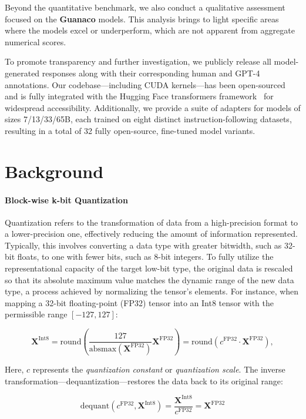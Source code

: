 Beyond the quantitative benchmark, we also conduct a qualitative assessment focused on the \textbf{Guanaco} models. This analysis brings to light specific areas where the models excel or underperform, which are not apparent from aggregate numerical scores.

To promote transparency and further investigation, we publicly release all model-generated responses along with their corresponding human and GPT-4 annotations. Our codebase—including CUDA kernels—has been open-sourced and is fully integrated with the Hugging Face transformers framework~\citep{wolf2019huggingface} for widespread accessibility. Additionally, we provide a suite of adapters for models of sizes 7/13/33/65B, each trained on eight distinct instruction-following datasets, resulting in a total of 32 fully open-source, fine-tuned model variants.

\section{Background}
\paragraph{Block-wise k-bit Quantization} Quantization refers to the transformation of data from a high-precision format to a lower-precision one, effectively reducing the amount of information represented. Typically, this involves converting a data type with greater bitwidth, such as 32-bit floats, to one with fewer bits, such as 8-bit integers. To fully utilize the representational capacity of the target low-bit type, the original data is rescaled so that its absolute maximum value matches the dynamic range of the new data type, a process achieved by normalizing the tensor's elements. For instance, when mapping a 32-bit floating-point (FP32) tensor into an Int8 tensor with the permissible range $[-127, 127]$:

\begin{equation}
    \mathbf{X}^{ \text{Int8}} = \text{round}\left( \frac{127}{{\text{absmax}}(\mathbf{X}^{{\text{FP32}}})}\mathbf{X}^{{\text{FP32}}} \right) = \text{round}(c^{\text{FP32}}\cdot \mathbf{X}^{{\text{FP32}}}),
\end{equation}

Here, $c$ represents the {\em quantization constant} or {\em quantization scale}. The inverse transformation—dequantization—restores the data back to its original range:

\begin{equation}
    \text{dequant}(c^{\text{FP32}}, \mathbf{X}^{\text{Int8}}) = \frac{\mathbf{X}^{\text{Int8}}}{c^{\text{FP32}}} = \mathbf{X}^{\text{FP32}}
\end{equation}


